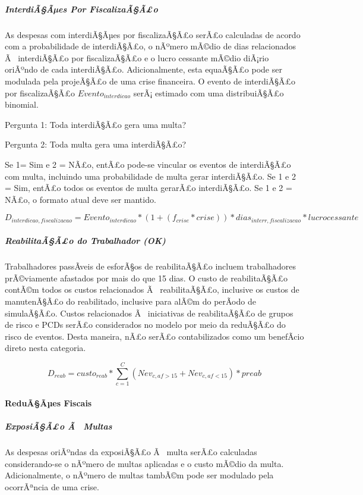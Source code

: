 \documentclass[]{article}
\let\oldparagraph\paragraph
\renewcommand{\paragraph}[1]{\oldparagraph{#1}\mbox{}}
\let\oldsubparagraph\subparagraph
\renewcommand{\subparagraph}[1]{\oldsubparagraph{#1}\mbox{}}
\begin{document}
\subparagraph{InterdiÃ§Ãµes Por
FiscalizaÃ§Ã£o}\label{interdiaaes-por-fiscalizaaao}

As despesas com interdiÃ§Ãµes por fiscalizaÃ§Ã£o serÃ£o calculadas de
acordo com a probabilidade de interdiÃ§Ã£o, o nÃºmero mÃ©dio de dias
relacionados Ã~ interdiÃ§Ã£o por fiscalizaÃ§Ã£o e o lucro cessante
mÃ©dio diÃ¡rio oriÃºndo de cada interdiÃ§Ã£o. Adicionalmente, esta
equaÃ§Ã£o pode ser modulada pela projeÃ§Ã£o de uma crise financeira. O
evento de interdiÃ§Ã£o por fiscalizaÃ§Ã£o \(Evento_{interdicao}\) serÃ¡
estimado com uma distribuiÃ§Ã£o binomial.

Pergunta 1: Toda interdiÃ§Ã£o gera uma multa?

Pergunta 2: Toda multa gera uma interdiÃ§Ã£o?

Se 1= Sim e 2 = NÃ£o, entÃ£o pode-se vincular os eventos de interdiÃ§Ã£o
com multa, incluindo uma probabilidade de multa gerar interdiÃ§Ã£o. Se 1
e 2 = Sim, entÃ£o todos os eventos de multa gerarÃ£o interdiÃ§Ã£o. Se 1
e 2 = NÃ£o, o formato atual deve ser mantido.

\[D_{interdicao, fiscalizacao} = Evento_{interdicao} * (1+(f_{crise}*crise)) * dias_{interr,fiscalizacao} * lucrocessante \]

\subparagraph{ReabilitaÃ§Ã£o do Trabalhador
(OK)}\label{reabilitaaao-do-trabalhador-ok}

Trabalhadores passÃ­veis de esforÃ§os de reabilitaÃ§Ã£o incluem
trabalhadores prÃ©viamente afastados por mais do que 15 dias. O custo de
reabilitaÃ§Ã£o contÃ©m todos os custos relacionados Ã~ reabilitaÃ§Ã£o,
inclusive os custos de manutenÃ§Ã£o do reabilitado, inclusive para alÃ©m
do perÃ­odo de simulaÃ§Ã£o. Custos relacionados Ã~ iniciativas de
reabilitaÃ§Ã£o de grupos de risco e PCDs serÃ£o considerados no modelo
por meio da reduÃ§Ã£o do risco de eventos. Desta maneira, nÃ£o serÃ£o
contabilizados como um benefÃ­cio direto nesta categoria.

\[D_{reab} = custo_{reab} * \sum_{c=1}^{C}(Nev_{c, af>15} + Nev_{c, af<15}) * preab \]

\paragraph{ReduÃ§Ãµes Fiscais}\label{reduaaes-fiscais}

\subparagraph{ExposiÃ§Ã£o Ã~ Multas}\label{exposiaao-a-multas}

As despesas oriÃºndas da exposiÃ§Ã£o Ã~ multa serÃ£o calculadas
considerando-se o nÃºmero de multas aplicadas e o custo mÃ©dio da multa.
Adicionalmente, o nÃºmero de multas tambÃ©m pode ser modulado pela
ocorrÃªncia de uma crise.
\end{document}
